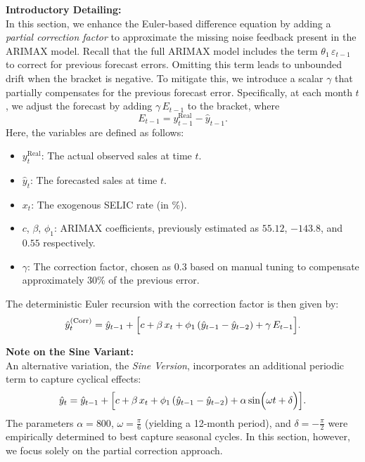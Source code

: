 \documentclass{article}
\begin{document}
\textbf{Introductory Detailing:}\\
In this section, we enhance the Euler-based difference equation by adding a \emph{partial correction factor} to approximate the missing noise feedback present in the ARIMAX model. Recall that the full ARIMAX model includes the term \(\theta_1\,\varepsilon_{t-1}\) to correct for previous forecast errors. Omitting this term leads to unbounded drift when the bracket is negative. To mitigate this, we introduce a scalar \(\gamma\) that partially compensates for the previous forecast error. Specifically, at each month \(t\), we adjust the forecast by adding \(\gamma\,E_{t-1}\) to the bracket, where
\[
E_{t-1} = y_{t-1}^{\mathrm{Real}} - \hat{y}_{t-1}.
\]
Here, the variables are defined as follows:
\begin{itemize}
    \item \(y_t^{\mathrm{Real}}\): The actual observed sales at time \(t\).
    \item \(\hat{y}_t\): The forecasted sales at time \(t\).
    \item \(x_t\): The exogenous SELIC rate (in \%).
    \item \(c\), \(\beta\), \(\phi_1\): ARIMAX coefficients, previously estimated as \(55.12\), \(-143.8\), and \(0.55\) respectively.
    \item \(\gamma\): The correction factor, chosen as \(0.3\) based on manual tuning to compensate approximately 30\% of the previous error.
\end{itemize}

The deterministic Euler recursion with the correction factor is then given by:
\[
\hat{y}_t^{(\mathrm{Corr})} = \hat{y}_{t-1} + \Bigl[c + \beta\,x_t + \phi_1\,(\hat{y}_{t-1}-\hat{y}_{t-2}) + \gamma\,E_{t-1}\Bigr].
\]

\textbf{Note on the Sine Variant:}\\
An alternative variation, the \emph{Sine Version}, incorporates an additional periodic term to capture cyclical effects:
\[
\hat{y}_t = \hat{y}_{t-1} + \Bigl[c + \beta\,x_t + \phi_1\,(\hat{y}_{t-1}-\hat{y}_{t-2}) + \alpha\sin\Bigl(\omega t + \delta\Bigr)\Bigr].
\]
The parameters \(\alpha = 800\), \(\omega = \frac{\pi}{6}\) (yielding a 12-month period), and \(\delta = -\frac{\pi}{2}\) were empirically determined to best capture seasonal cycles. In this section, however, we focus solely on the partial correction approach.
\end{document}
